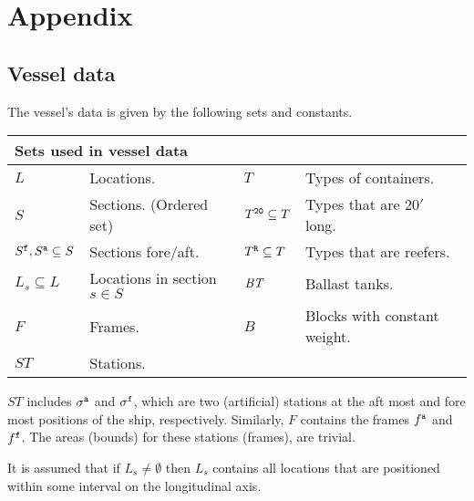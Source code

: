 %
%
\section*{Appendix}
\subsection*{Vessel data}
The vessel's data is given by the following sets and constants.

\vspace{1mm}
\noindent
\begin{tabular}{p{1.8cm}p{4cm}|p{1.3cm}p{4.5cm}}
\multicolumn{2}{l}{\textbf{Sets used in vessel data}}\\
\hline\noalign{\smallskip}
$L$  & Locations. &
$T$	 & Types of containers.\\ 
$S$	 & Sections. (Ordered set)&
$T^{\texttt{20}}\subseteq T$ & Types that are $20'$ long. \\
$S^{\texttt{f}}, S^{\texttt{a}}\subseteq S$ & Sections fore/aft. &
$T^{\texttt{R}}\subseteq T$ & Types that are reefers.\\
$L_s\subseteq L$ & Locations in section $s\in S$ &
$\mathit{BT}$ & Ballast tanks. \\
$F$	 & Frames. &
$B$ & Blocks with constant weight.\\
$ST$ & Stations. 
\end{tabular}

\vspace{1mm}
\noindent
$ST$ includes $\sigma^{\texttt{a}}$ and $\sigma^{\texttt{f}}$, which are two (artificial) stations at the aft most and fore most positions of the ship, respectively. Similarly, $F$ contains the frames $f^{\texttt{a}}$ and $f^{\texttt{f}}$. The areas (bounds) for these stations (frames), are trivial.

It is assumed that if $L_s\neq \emptyset$ then $L_s$ contains all locations that are positioned within some interval on the longitudinal axis.    

